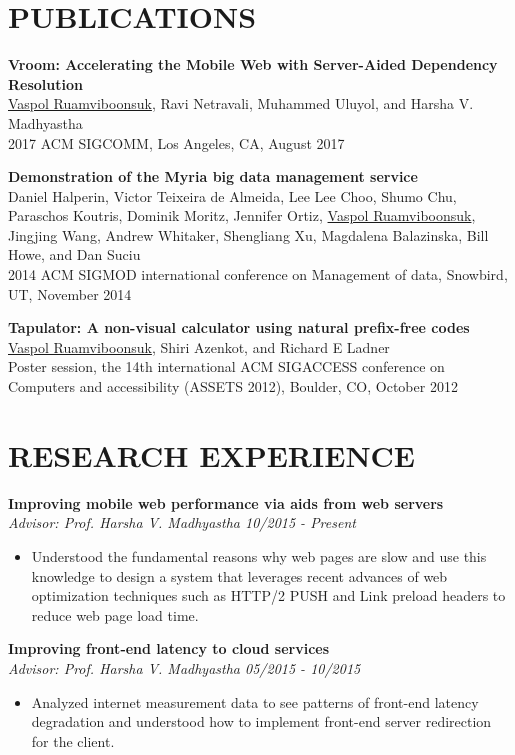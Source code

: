 \documentclass[zhemargin]{res}
\begin{document}
\begin{resume}
\section{\small PUBLICATIONS}
    \textbf{Vroom: Accelerating the Mobile Web with Server-Aided Dependency Resolution}\\
    \underline{Vaspol Ruamviboonsuk}, Ravi Netravali, Muhammed Uluyol, and Harsha V. Madhyastha\\
    2017 ACM SIGCOMM, Los Angeles, CA, August 2017

    \textbf{Demonstration of the Myria big data management service}\\
    Daniel Halperin, Victor Teixeira de Almeida, Lee Lee Choo, Shumo Chu, Paraschos Koutris, 
    Dominik Moritz, Jennifer Ortiz, \underline{Vaspol Ruamviboonsuk}, Jingjing Wang, 
    Andrew Whitaker, Shengliang Xu, Magdalena Balazinska, Bill Howe, and Dan Suciu\\
    2014 ACM SIGMOD international conference on Management of data, Snowbird, UT, November 2014

    \textbf{Tapulator: A non-visual calculator using natural prefix-free codes}\\
    \underline{Vaspol Ruamviboonsuk}, Shiri Azenkot, and Richard E Ladner\\
    Poster session, the 14th international ACM SIGACCESS conference on Computers and accessibility (ASSETS 2012), Boulder, CO, October 2012

\section{\small RESEARCH EXPERIENCE}
	\textbf{Improving mobile web performance via aids from web servers}\\
    \textit{Advisor: Prof. Harsha V. Madhyastha \hfill 10/2015 - Present}
	\begin{itemize}
    \item Understood the fundamental reasons why web pages are slow and use this 
      knowledge to design a system that leverages recent advances of web optimization 
      techniques such as HTTP/2 PUSH and Link preload headers to reduce 
      web page load time.
	\end{itemize}

	\textbf{Improving front-end latency to cloud services}\\
    \textit{Advisor: Prof. Harsha V. Madhyastha \hfill 05/2015 - 10/2015}
	\begin{itemize}
    \item Analyzed internet measurement data to see patterns of front-end latency 
      degradation and understood how to implement front-end server redirection for the client.
	\end{itemize}


\end{resume}
\end{document}
